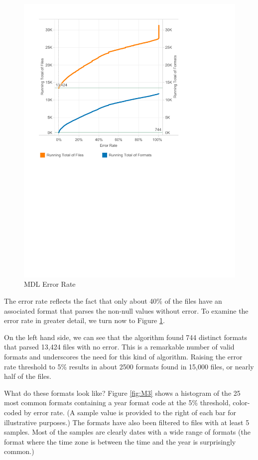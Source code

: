 \begin{figure}[ht]
\centering
\includegraphics[width=\columnwidth]{figures/FigureM2}
\caption{MDL Error Rate}
\label{fig:M2}
\end{figure}


The error rate reflects the fact that only about 40\% of the files have an associated format that parses the non-null values without error. To examine the error rate in greater detail, we turn now to Figure \ref{fig:M2}.

On the left hand side, we can see that the algorithm found 744 distinct formats that parsed 13,424 files with no error. This is a remarkable number of valid formats and underscores the need for this kind of algorithm. Raising the error rate threshold to 5\% results in about 2500 formats found in 15,000 files, or nearly half of the files. 

What do these formats look like? Figure \ref{fig:M3} shows a histogram of the 25 most common formats containing a year format code at the 5\% threshold, color-coded by error rate. (A sample value is provided to the right of each bar for illustrative purposes.) The formats have also been filtered to files with at least 5 samples. Most of the samples are clearly dates with a wide range of formats (the format where the time zone is between the time and the year is surprisingly common.)
 
